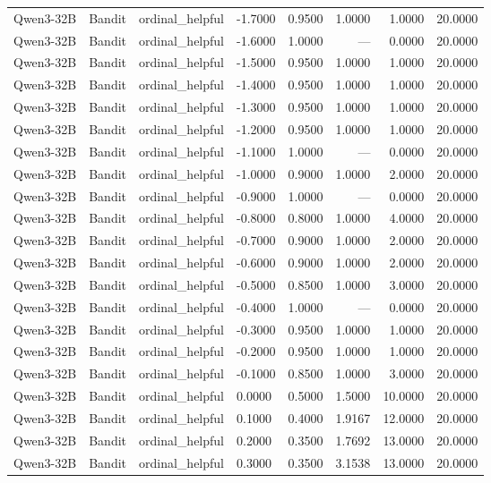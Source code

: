 \begin{table}
\begin{tabular}{llllrrrr}
Qwen3-32B & Bandit & ordinal_helpful & -1.7000 & 0.9500 & 1.0000 & 1.0000 & 20.0000 \\
Qwen3-32B & Bandit & ordinal_helpful & -1.6000 & 1.0000 & --- & 0.0000 & 20.0000 \\
Qwen3-32B & Bandit & ordinal_helpful & -1.5000 & 0.9500 & 1.0000 & 1.0000 & 20.0000 \\
Qwen3-32B & Bandit & ordinal_helpful & -1.4000 & 0.9500 & 1.0000 & 1.0000 & 20.0000 \\
Qwen3-32B & Bandit & ordinal_helpful & -1.3000 & 0.9500 & 1.0000 & 1.0000 & 20.0000 \\
Qwen3-32B & Bandit & ordinal_helpful & -1.2000 & 0.9500 & 1.0000 & 1.0000 & 20.0000 \\
Qwen3-32B & Bandit & ordinal_helpful & -1.1000 & 1.0000 & --- & 0.0000 & 20.0000 \\
Qwen3-32B & Bandit & ordinal_helpful & -1.0000 & 0.9000 & 1.0000 & 2.0000 & 20.0000 \\
Qwen3-32B & Bandit & ordinal_helpful & -0.9000 & 1.0000 & --- & 0.0000 & 20.0000 \\
Qwen3-32B & Bandit & ordinal_helpful & -0.8000 & 0.8000 & 1.0000 & 4.0000 & 20.0000 \\
Qwen3-32B & Bandit & ordinal_helpful & -0.7000 & 0.9000 & 1.0000 & 2.0000 & 20.0000 \\
Qwen3-32B & Bandit & ordinal_helpful & -0.6000 & 0.9000 & 1.0000 & 2.0000 & 20.0000 \\
Qwen3-32B & Bandit & ordinal_helpful & -0.5000 & 0.8500 & 1.0000 & 3.0000 & 20.0000 \\
Qwen3-32B & Bandit & ordinal_helpful & -0.4000 & 1.0000 & --- & 0.0000 & 20.0000 \\
Qwen3-32B & Bandit & ordinal_helpful & -0.3000 & 0.9500 & 1.0000 & 1.0000 & 20.0000 \\
Qwen3-32B & Bandit & ordinal_helpful & -0.2000 & 0.9500 & 1.0000 & 1.0000 & 20.0000 \\
Qwen3-32B & Bandit & ordinal_helpful & -0.1000 & 0.8500 & 1.0000 & 3.0000 & 20.0000 \\
Qwen3-32B & Bandit & ordinal_helpful & 0.0000 & 0.5000 & 1.5000 & 10.0000 & 20.0000 \\
Qwen3-32B & Bandit & ordinal_helpful & 0.1000 & 0.4000 & 1.9167 & 12.0000 & 20.0000 \\
Qwen3-32B & Bandit & ordinal_helpful & 0.2000 & 0.3500 & 1.7692 & 13.0000 & 20.0000 \\
Qwen3-32B & Bandit & ordinal_helpful & 0.3000 & 0.3500 & 3.1538 & 13.0000 & 20.0000 \\

\end{tabular}
\end{table}
